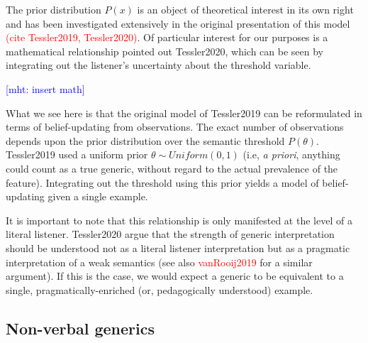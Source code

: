 \documentclass[10pt,letterpaper]{article}
\newcommand{\red}[1]{\textcolor{Red}{#1}}
\newcommand{\mht}[1]{\textcolor{Blue}{[mht: #1]}}
\begin{document}
The prior distribution $P(x)$ is an object of theoretical interest in its own right and has been investigated extensively in the original presentation of this model \red{(cite Tessler2019, Tessler2020)}. 
Of particular interest for our purposes is a mathematical relationship pointed out Tessler2020, which can be seen by integrating out the listener's uncertainty about the threshold variable. 

\mht{insert math}

What we see here is that the original model of Tessler2019 can be reformulated in terms of belief-updating from observations. 
The exact number of observations depends upon the prior distribution over the semantic threshold $P(\theta)$.  
Tessler2019 used a uniform prior $\theta \sim Uniform(0,1)$ (i.e, \emph{a priori}, anything could count as a true generic, without regard to the actual prevalence of the feature).
Integrating out the threshold using this prior yields a model of belief-updating given a single example. 

It is important to note that this relationship is only manifested at the level of a literal listener.
Tessler2020 argue that the strength of generic interpretation should be understood not as a literal listener interpretation but as a pragmatic interpretation of a weak semantics (see also \red{vanRooij2019} for a similar argument). 
If this is the case, we would expect a generic to be equivalent to a single, pragmatically-enriched (or, pedagogically understood) example. 


\subsection{Non-verbal generics}
\end{document}
